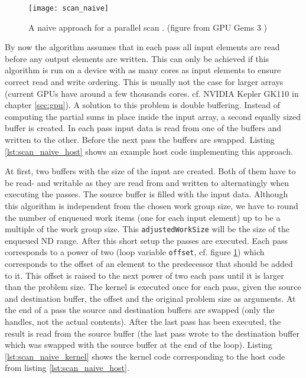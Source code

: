 \begin{figure}
\centering
\texttt{[image: scan\_naive]}
\caption{A naive approach for a parallel scan \cite{scan_naive}. (figure from GPU Gems 3 \cite{gpu_gems_3_chapter_39})}
\label{fig:scan_naive}
\end{figure}

By now the algorithm assumes that in each pass all input elements are read before any output elements are written. This can only be achieved if this algorithm is run on a device with as many cores as input elements to ensure correct read and write ordering. This is usually not the case for larger arrays (current GPUs have around a few thousands cores. cf. NVIDIA Kepler GK110 in chapter \ref{sec:gpu}). A solution to this problem is double buffering. Instead of computing the partial sums in place inside the input array, a second equally sized buffer is created. In each pass input data is read from one of the buffers and written to the other. Before the next pass the buffers are swapped.
Listing \ref{lst:scan_naive_host} shows an example host code implementing this approach.



At first, two buffers with the size of the input are created. Both of them have to be read- and writable as they are read from and written to alternatingly when executing the passes. The source buffer is filled with the input data. Although this algorithm is independent from the chosen work group size, we have to round the number of enqueued work items (one for each input element) up to be a multiple of the work group size. This \lstinline!adjustedWorkSize! will be the size of the enqueued ND range. After this short setup the passes are executed. Each pass corresponds to a power of two (loop variable \lstinline!offset!, cf. figure \ref{fig:scan_naive}) which corresponds to the offset of an element to the predecessor that should be added to it. This offset is raised to the next power of two each pass until it is larger than the problem size. The kernel is executed once for each pass, given the source and destination buffer, the offset and the original problem size as arguments. At the end of a pass the source and destination buffers are swapped (only the handles, not the actual contents). After the last pass has been executed, the result is read from the source buffer (the last pass wrote to the destination buffer which was swapped with the source buffer at the end of the loop).
Listing \ref{lst:scan_naive_kernel} shows the kernel code corresponding to the host code from listing \ref{lst:scan_naive_host}.


